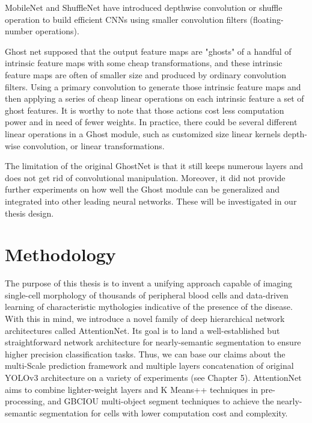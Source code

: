 MobileNet \cite{30} and ShuffleNet \cite{29} have introduced depthwise convolution or shuffle operation to build efficient CNNs using  smaller convolution  filters  (floating-number operations).

Ghost net\cite{19} supposed that the output feature maps are "ghosts" of a handful of intrinsic feature maps with some cheap transformations, and these intrinsic feature maps are often of smaller size and produced by ordinary convolution filters. Using a primary convolution to generate those intrinsic feature maps and then applying a series of cheap linear operations on each intrinsic feature a  set of ghost features. It is worthy to note that those actions cost less computation power and in need of fewer weights. In practice, there could be several different linear operations in a Ghost module, such as customized size linear kernels depth-wise convolution, or linear transformations\cite{19}.

The limitation of the original GhostNet \cite{19} is that it still keeps numerous layers and does not get rid of convolutional manipulation. Moreover, it did not provide further experiments on how well the Ghost module can be generalized and integrated into other leading neural networks. These will be investigated in our thesis design.















\chapter{Methodology}
\label{sec:Methodology}
The purpose of this thesis is to invent a unifying approach capable of imaging single-cell morphology of thousands of peripheral blood cells and data-driven learning of characteristic mythologies indicative of the presence of the disease. With this in mind, we introduce a novel family of deep hierarchical network architectures called AttentionNet. Its goal is to land a well-established but straightforward network architecture for nearly-semantic segmentation to ensure higher precision classification tasks. Thus, we can base our claims about the multi-Scale prediction framework and multiple layers concatenation of original YOLOv3 \cite{33} architecture on a variety of experiments  (see Chapter 5). AttentionNet aims to combine lighter-weight layers and K Means++ techniques in pre-processing, and GBCIOU multi-object segment techniques to achieve the nearly-semantic segmentation for cells with lower computation cost and complexity.

